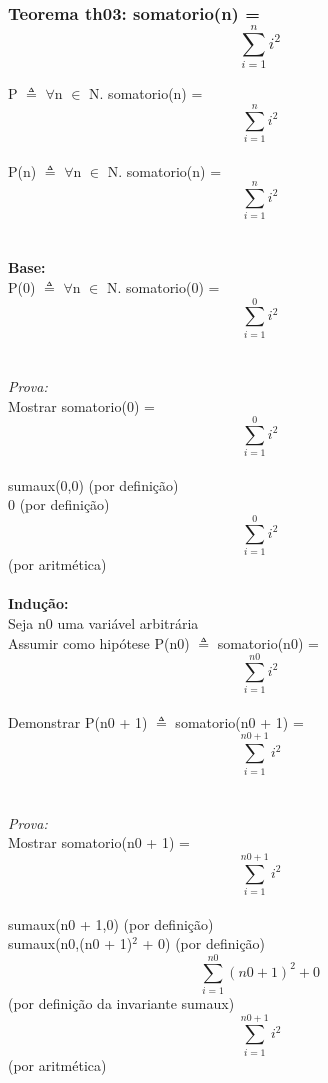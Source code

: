 \documentclass{article}
\begin{document}
\subsubsection{Teorema th03: somatorio(n) = $$\sum_{i=1}^{n} i^{2}$$}
P $\triangleq$ $\forall$n $\in$ N. somatorio(n) = $$\sum_{i=1}^{n} i^{2}$$
\\P(n) $\triangleq$ $\forall$n $\in$ N. somatorio(n) = $$\sum_{i=1}^{n} i^{2}$$
\\
\\\textbf{Base:}
\\P(0) $\triangleq$ $\forall$n $\in$ N. somatorio(0) = $$\sum_{i=1}^{0} i^{2}$$
\\
\\\textit{Prova:}
\\Mostrar somatorio(0) = $$\sum_{i=1}^{0} i^{2}$$
\\sumaux(0,0) (por definição)
\\0 (por definição)
\\$$\sum_{i=1}^{0} i^{2}$$ (por aritmética)
\\
\\\textbf{Indução:}
\\Seja n0 uma variável arbitrária
\\Assumir como hipótese P(n0) $\triangleq$ somatorio(n0) = $$\sum_{i=1}^{n0} i^{2}$$
\\Demonstrar P(n0 + 1) $\triangleq$ somatorio(n0 + 1) = $$\sum_{i=1}^{n0 + 1} i^{2}$$
\\
\\\textit{Prova:}
\\Mostrar somatorio(n0 + 1) = $$\sum_{i=1}^{n0 + 1} i^{2}$$
\\sumaux(n0 + 1,0) (por definição)
\\sumaux(n0,(n0 + 1)$^{2}$ + 0) (por definição)
\\$$\sum_{i=1}^{n0} (n0 + 1)^{2} + 0$$ (por definição da invariante sumaux)
\\$$\sum_{i=1}^{n0 + 1} i^{2}$$(por aritmética)
\\
\end{document}

